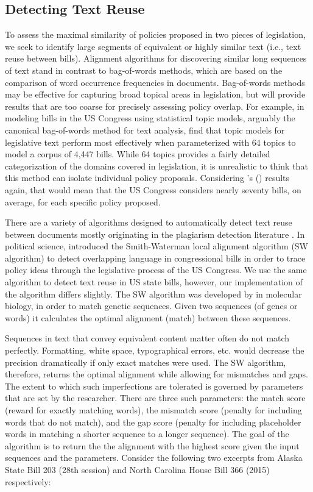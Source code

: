 \documentclass[12pt]{article} %
\def\citeapos#1{\citeauthor{#1}'s (\citeyear{#1})}
\begin{document}
\subsection{Detecting Text Reuse}
\label{sec:d_t_r}
To assess the maximal similarity of policies proposed in two pieces of legislation, we seek to identify large segments of equivalent or highly similar text (i.e., text reuse between bills). Alignment algorithms for discovering similar long sequences of text stand in contrast to bag-of-words methods, which are based on the comparison of word occurrence frequencies in documents. Bag-of-words methods may be effective for capturing broad topical areas in legislation, but will provide results that are too coarse for precisely assessing policy overlap. For example, in modeling bills in the US Congress using statistical topic models, arguably the canonical bag-of-words method for text analysis, \citet{gerrish2011predicting} find that topic models for legislative text perform most effectively when parameterized with 64 topics to model a corpus of 4,447 bills. While 64 topics provides a fairly detailed categorization of the domains covered in legislation, it is unrealistic to think that this method can isolate individual policy proposals.  Considering \citeapos{gerrish2011predicting} results again, that would mean that the US Congress considers nearly seventy bills, on average, for each specific policy proposed. 

There are a variety of algorithms designed to automatically detect text reuse between documents mostly originating in the plagiarism detection literature \citep[see e.g.][for an overview]{potthast2013overview}. In political science, \citet{wilkerson2015tracing} introduced the Smith-Waterman local alignment algorithm (SW algorithm) to detect overlapping language in congressional bills in order to trace policy ideas through the legislative process of the US Congress. We use the same algorithm to detect text reuse in US state bills, however, our implementation of the algorithm differs slightly. The SW algorithm was developed by \citet{smith1981identification} in molecular biology, in order to match genetic sequences. Given two sequences (of genes or words) it calculates the optimal alignment (match) between these sequences. 

Sequences in text that convey equivalent content matter often do not match perfectly. Formatting, white space, typographical errors, etc. would decrease the precision dramatically if only exact matches were used. The SW algorithm, therefore, returns the optimal alignment while allowing for mismatches and gaps. The extent to which such imperfections are tolerated is governed by parameters that are set by the researcher. There are three such parameters: the match score (reward for exactly matching words), the mismatch score (penalty for including words that do not match), and the gap score (penalty for including placeholder words in matching a shorter sequence to a longer sequence). The goal of the algorithm is to return the the alignment with the highest score given the input sequences and the parameters. Consider the following two excerpts from Alaska State Bill 203 (28th session) and North Carolina House Bill 366 (2015) respectively:
\end{document}
